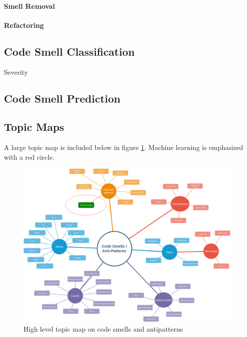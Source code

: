 \documentclass[conference]{IEEEtran}
\begin{document}
\paragraph{Smell Removal}
\paragraph{Refactoring}
\subsection{Code Smell Classification}
Severity
\subsection{Code Smell Prediction}

\subsection{Topic Maps}

A large topic map is included below in figure \ref{fig:TM}.
Machine learning is emphasized with a red circle. 
\begin{figure}[ht]
  \centerline{\includegraphics[width=\linewidth]{AntiPattern-TopicMap.png}}
  \caption{High level topic map on code smells and antipatterns}
  \label{fig:TM}
\end{figure} 
\end{document}
